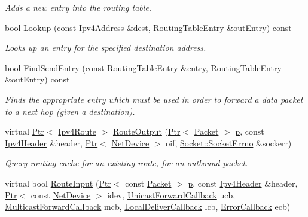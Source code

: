 \begin{DoxyCompactItemize}
\begin{DoxyCompactList}\small\item\em Adds a new entry into the routing table. \end{DoxyCompactList}\item 
bool \hyperlink{classns3_1_1olsr_1_1RoutingProtocol_a514bf401454b233af509476fc3fd5d6b}{Lookup} (const \hyperlink{classns3_1_1Ipv4Address}{Ipv4\+Address} \&dest, \hyperlink{structns3_1_1olsr_1_1RoutingTableEntry}{Routing\+Table\+Entry} \&out\+Entry) const 
\begin{DoxyCompactList}\small\item\em Looks up an entry for the specified destination address. \end{DoxyCompactList}\item 
bool \hyperlink{classns3_1_1olsr_1_1RoutingProtocol_a15394858cdfb821d54f8661ed712083c}{Find\+Send\+Entry} (const \hyperlink{structns3_1_1olsr_1_1RoutingTableEntry}{Routing\+Table\+Entry} \&entry, \hyperlink{structns3_1_1olsr_1_1RoutingTableEntry}{Routing\+Table\+Entry} \&out\+Entry) const 
\begin{DoxyCompactList}\small\item\em Finds the appropriate entry which must be used in order to forward a data packet to a next hop (given a destination). \end{DoxyCompactList}\item 
virtual \hyperlink{classns3_1_1Ptr}{Ptr}$<$ \hyperlink{classns3_1_1Ipv4Route}{Ipv4\+Route} $>$ \hyperlink{classns3_1_1olsr_1_1RoutingProtocol_a4b0f79333d7f1f1a68ff057e8f00512d}{Route\+Output} (\hyperlink{classns3_1_1Ptr}{Ptr}$<$ \hyperlink{classns3_1_1Packet}{Packet} $>$ \hyperlink{lte__link__budget__x2__handover__measures_8m_ac9de518908a968428863f829398a4e62}{p}, const \hyperlink{classns3_1_1Ipv4Header}{Ipv4\+Header} \&header, \hyperlink{classns3_1_1Ptr}{Ptr}$<$ \hyperlink{classns3_1_1NetDevice}{Net\+Device} $>$ oif, \hyperlink{classns3_1_1Socket_ada1328c5ae0c28cb2a982caf8f6d6cca}{Socket\+::\+Socket\+Errno} \&sockerr)
\begin{DoxyCompactList}\small\item\em Query routing cache for an existing route, for an outbound packet. \end{DoxyCompactList}\item 
virtual bool \hyperlink{classns3_1_1olsr_1_1RoutingProtocol_aa0291ccccb5e4e0d42e8b5da4167a5ab}{Route\+Input} (\hyperlink{classns3_1_1Ptr}{Ptr}$<$ const \hyperlink{classns3_1_1Packet}{Packet} $>$ \hyperlink{lte__link__budget__x2__handover__measures_8m_ac9de518908a968428863f829398a4e62}{p}, const \hyperlink{classns3_1_1Ipv4Header}{Ipv4\+Header} \&header, \hyperlink{classns3_1_1Ptr}{Ptr}$<$ const \hyperlink{classns3_1_1NetDevice}{Net\+Device} $>$ idev, \hyperlink{classns3_1_1Ipv4RoutingProtocol_a3453a85764cbbb1e704da7e919aa5d19}{Unicast\+Forward\+Callback} ucb, \hyperlink{classns3_1_1Ipv4RoutingProtocol_a26e76f7a555462e6c08fceda64a99d58}{Multicast\+Forward\+Callback} mcb, \hyperlink{classns3_1_1Ipv4RoutingProtocol_aa6ffa0159cb143daa3c46d2ba69bb1b9}{Local\+Deliver\+Callback} lcb, \hyperlink{classns3_1_1Ipv4RoutingProtocol_a0348285418c30d5021b08f7a68af21ea}{Error\+Callback} ecb)

\end{DoxyCompactItemize}
